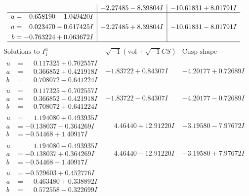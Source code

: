 \documentclass[1p]{elsarticle_modified}
\theoremstyle{definition}
\newcommand{\I}{\sqrt{-1}}
\begin{document}
$$\begin{array}{c|c|c}
 & -2.27485 - 8.39804 I & -10.61831 + 8.01791 I \\ \hline\begin{aligned}
u &= \phantom{-}0.658190 - 1.049420 I \\
a &= \phantom{-}0.023470 - 0.617425 I \\
b &= -0.763224 + 0.063672 I\end{aligned}
 & -2.27485 + 8.39804 I & -10.61831 - 8.01791 I\\
 \hline 
 \end{array}$$\newpage$$\begin{array}{c|c|c}  
\text{Solutions to }I^u_{1}& \I (\text{vol} + \sqrt{-1}CS) & \text{Cusp shape}\\
 \hline 
\begin{aligned}
u &= \phantom{-}0.117325 + 0.702557 I \\
a &= \phantom{-}0.366852 + 0.421918 I \\
b &= \phantom{-}0.708072 - 0.641224 I\end{aligned}
 & -1.83722 + 0.84307 I & -4.20177 + 0.72689 I \\ \hline\begin{aligned}
u &= \phantom{-}0.117325 - 0.702557 I \\
a &= \phantom{-}0.366852 - 0.421918 I \\
b &= \phantom{-}0.708072 + 0.641224 I\end{aligned}
 & -1.83722 - 0.84307 I & -4.20177 - 0.72689 I \\ \hline\begin{aligned}
u &= \phantom{-}1.194080 + 0.493935 I \\
a &= -0.138037 - 0.364269 I \\
b &= -0.54468 + 1.40917 I\end{aligned}
 & \phantom{-}4.46440 + 12.91220 I & -3.19580 - 7.97672 I \\ \hline\begin{aligned}
u &= \phantom{-}1.194080 - 0.493935 I \\
a &= -0.138037 + 0.364269 I \\
b &= -0.54468 - 1.40917 I\end{aligned}
 & \phantom{-}4.46440 - 12.91220 I & -3.19580 + 7.97672 I \\ \hline\begin{aligned}
u &= -0.529603 + 0.452776 I \\
a &= \phantom{-}0.463480 + 0.338892 I \\
b &= \phantom{-}0.572558 - 0.322699 I\end{aligned}

\end{array}$$
\end{document}
